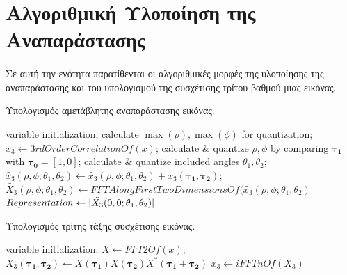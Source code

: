 
\section{Αλγοριθμική Υλοποίηση της Αναπαράστασης}
\paragraph*{}
Σε αυτή την ενότητα παρατίθενται οι αλγοριθμικές μορφές της υλοποίησης της αναπαράστασης και του υπολογισμού της συσχέτισης τρίτου βαθμού μιας εικόνας.\\


\begin{algorithm}
\caption{Υπολογισμός αμετάβλητης αναπαράστασης εικόνας.}
\label{alg:imRep}
\begin{algorithmic}[1]
\STATE variable initialization;
\STATE calculate $\max(\rho),\max(\phi)$ for quantization;
\STATE $x_3 \gets 3rdOrderCorrelationOf(x)$;
		\STATE calculate \& quantize $\rho,\phi$ by comparing $\boldsymbol{\tau_1}$ with $\boldsymbol{\tau_0} = [1,0]$;
		\STATE calculate \& quantize included angles $\theta_1,\theta_2$;
		\STATE $\tilde{x_3}(\rho,\phi;\theta_1,\theta_2) \gets \tilde{x_3}(\rho,\phi;\theta_1,\theta_2) + x_3(\boldsymbol{\tau_1},\boldsymbol{\tau_2})$;
	\ENDFOR
\ENDFOR
\STATE $\tilde{X_3}(\rho,\phi;\theta_1,\theta_2) \gets FFTAlongFirstTwoDimensionsOf(\tilde{x_3}(\rho,\phi;\theta_1,\theta_2)$
\STATE $Representation \gets \lvert\tilde{X_3}(0, 0;\theta_1,\theta_2)\rvert$
\end{algorithmic}
\end{algorithm}


\begin{algorithm}
\caption{Υπολογισμός τρίτης τάξης συσχέτισης εικόνας.}
\label{alg:dft23}
\begin{algorithmic}[1]
\STATE variable initialization;
\STATE $X \gets FFT2Of(x)$;
		\STATE $X_3(\boldsymbol{\tau_1}, \boldsymbol{\tau_2}) \gets X(\boldsymbol{\tau_1}) X(\boldsymbol{\tau_2}) X^*(\boldsymbol{\tau_1} + \boldsymbol{\tau_2})$
	\ENDFOR
\ENDFOR
\STATE $x_3 \gets iFFTnOf(X_3)$
\end{algorithmic}
\end{algorithm}

